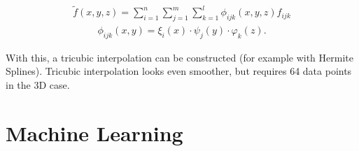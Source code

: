 \begin{align}
    \widetilde{f}(x,y,z) = \sum_{i=1}^n\sum_{j=1}^{m}\sum_{k=1}^{l} \phi_{ijk}(x,y,z)f_{ijk}
\end{align}
\begin{align}    
    \phi_{ijk}(x, y) = \xi_i(x) \cdot \psi_j(y) \cdot \varphi_k(z).
\end{align}

With this, a tricubic interpolation can be constructed (for example with Hermite Splines). Tricubic interpolation looks even smoother, but requires 64 data points in the 3D case.



\section{Machine Learning}



